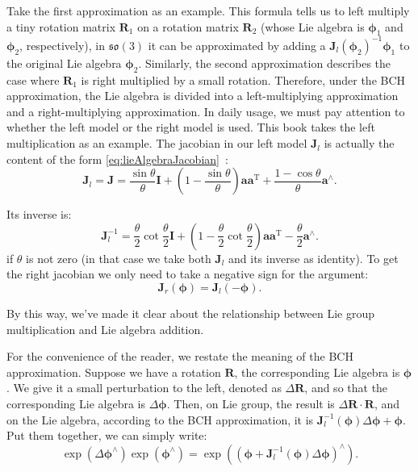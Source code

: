 Take the first approximation as an example. This formula tells us to left multiply a tiny rotation matrix $\mathbf{R}_1$ on a rotation matrix $\mathbf{R}_2$ (whose Lie algebra is $\boldsymbol{\phi}_1$ and $\boldsymbol{\phi}_2$, respectively), in $\mathfrak{so}(3)$ it can be approximated by adding a $\mathbf{J}_l \left( {\boldsymbol{\phi} _2} \right)^{ - 1} { \boldsymbol{\phi} _1}$ to the original Lie algebra $\boldsymbol{\phi}_2$.  Similarly, the second approximation describes the case where $\mathbf{R}_1$ is right multiplied by a small rotation. Therefore, under the BCH approximation, the Lie algebra is divided into a left-multiplying approximation and a right-multiplying approximation. In daily usage, we must pay attention to whether the left model or the right model is used. This book takes the left multiplication as an example. The jacobian in our left model $\mathbf{J}_l$ is actually the content of the form \eqref{eq:lieAlgebraJacobian}~:
\begin{equation}
{ \mathbf{J}_l} = \mathbf{J} = \frac{{\sin \theta }}{\theta } \mathbf{I} + \left( {1 - \frac{{\sin \theta } }{\theta }} \right) \mathbf{a} { \mathbf{a}^\mathrm{T}} + \frac{{1 - \cos \theta }}{\theta }{ \mathbf{a} ^ \wedge}.
\end{equation}

Its inverse is:
\begin{equation}
\mathbf{J}_l^{ - 1} = \frac{\theta }{2}\cot \frac{\theta }{2} \mathbf{I} + \left( {1 - \frac{\theta } {2}\cot \frac{\theta }{2}} \right) \mathbf{a} {\mathbf{a}^\mathrm{T}} - \frac{\theta }{2}{ \mathbf{ a}^ \wedge }.
\end{equation}
if $\theta$ is not zero (in that case we take both $\mathbf{J}_{l}$ and its inverse as identity). To get the right jacobian we only need to take a negative sign for the argument:
\begin{equation}
\mathbf{J}_r(\boldsymbol{\phi}) =\mathbf{J}_l(-\boldsymbol{\phi}) .
\end{equation}

By this way, we've made it clear about the relationship between Lie group multiplication and Lie algebra addition.

For the convenience of the reader, we restate the meaning of the BCH approximation. Suppose we have a rotation $\mathbf{R}$, the corresponding Lie algebra is $\boldsymbol{\phi}$. We give it a small perturbation to the left, denoted as $\Delta \mathbf{R}$, and so that the corresponding Lie algebra is $\Delta \boldsymbol{\phi}$. Then, on Lie group, the result is $ \Delta \mathbf{R} \cdot \mathbf{R}$, and on the Lie algebra, according to the BCH approximation, it is $\mathbf{J}_l^{-1 } (\boldsymbol{\phi}) \Delta \boldsymbol{\phi} + \boldsymbol{\phi}$. Put them together, we can simply write:
\begin{equation}
\exp \left( {\Delta { \boldsymbol{\phi} ^ \wedge }} \right)\exp \left( {{ \boldsymbol{\phi} ^ \wedge }} \right) = \exp \left( {{{\left( { \boldsymbol{\phi} + \mathbf{J}_l^{ - 1}\left( \boldsymbol{\phi} \right)\Delta \boldsymbol{\phi} } \right)} ^ \wedge }} \right).
\end{equation}

